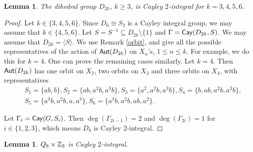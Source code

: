 \documentclass{amsart}
\newtheorem{lem}[thm]{Lemma}
\def \leq {\leqslant}
\def \geq {\geqslant}
\def\Aut{{\sf Aut}} \def\Inn{{\sf Inn}}\def\Core{{\sf Core}}
\def\Cay{{\sf Cay}} \def\Ker{{\sf Ker}}
\begin{document}
\begin{lem}\label{dihedral}
	The dihedral group $D_{2k}$, $k\geq 3$, is Cayley $2$-integral for  $k=3,4,5,6$.
\end{lem}
\begin{proof}
	Let	$k\in\{3,4,5,6\}$. Since $D_{6}\cong S_3$ is a Cayley integral group,  we may assume that $k\in\{4,5,6\}$. Let  $S=S^{-1}\subseteq D_{2k}\setminus\{1\}$  and  $\Gamma=\Cay(D_{2k},S)$. We may assume that $D_{2k}=\langle S\rangle$. We use Remark \ref{orbit}, and give all the possible representatives of the action of $\Aut(D_{2k})$ on $X_n$'s, $1\leq n\leq k$. For example, we do this for $k=4$. One can prove the remaining cases similarly. Let $k=4$. Then $\Aut(D_{2k})$ has one orbit on $X_2$, two orbits on $X_3$ and three orbits on $X_4$, with representatives
	\begin{eqnarray*}
		&&S_1=\{ab,b\}, S_2=\{ab,a^2b,a^3b\}, S_3=\{a^2,a^2b,a^3b\}, S_4=\{b,ab,a^2b,a^3b\},\\
		&& S_5=\{a^3b,a^2b,a,a^3\}, S_6=\{a^3b,a^2b,ab,a^2\}.
	\end{eqnarray*}
	
	Let $\Gamma_i=\Cay(G,S_i)$. Then $\deg(\Gamma_{2i-1})=2$ and $\deg(\Gamma_{2i})=1$ for $i\in\{1,2,3\}$, which means $D_{8}$ is Cayley $2$-integral.
\end{proof}
\begin{lem}\label{q8z3}
	$Q_8\times\Bbb Z_3$ is Cayley $2$-integral.
\end{lem}
\end{document}
